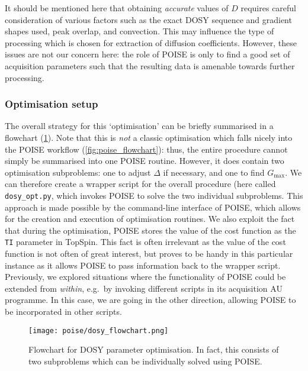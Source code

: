 It should be mentioned here that obtaining \textit{accurate} values of $D$ requires careful consideration of various factors such as the exact DOSY sequence and gradient shapes used\autocite{Sinnaeve2012CMR}, peak overlap\autocite{Antalek1996JACS,Windig1997CILS,Nilsson2006AC,Nilsson2008AC,Colbourne2011JACS}, and convection\autocite{Swan2015JMR,Barbosa2016RSCA}.
This may influence the type of processing which is chosen for extraction of diffusion coefficients.
However, these issues are not our concern here: the role of POISE is only to find a good set of acquisition parameters such that the resulting data is amenable towards further processing.


\subsubsection{Optimisation setup}

The overall strategy for this `optimisation' can be briefly summarised in a flowchart (\cref{fig:dosy_flowchart}).
Note that this is \textit{not} a classic optimisation which falls nicely into the POISE workflow (\cref{fig:poise_flowchart}): thus, the entire procedure cannot simply be summarised into one POISE routine.
However, it does contain two optimisation subproblems: one to adjust $\Delta$ if necessary, and one to find $G_\text{max}$.
We can therefore create a wrapper script for the overall procedure (here called \texttt{dosy\_opt.py}, which invokes POISE to solve the two individual subproblems.
This approach is made possible by the command-line interface of POISE, which allows for the creation and execution of optimisation routines.
We also exploit the fact that during the optimisation, POISE stores the value of the cost function as the \texttt{TI} parameter in TopSpin.
This fact is often irrelevant as the value of the cost function is not often of great interest, but proves to be handy in this particular instance as it allows POISE to pass information back to the wrapper script.
Previously, we explored situations where the functionality of POISE could be extended from \textit{within}, e.g.\ by invoking different scripts in its acquisition AU programme.
In this case, we are going in the other direction, allowing POISE to be incorporated in other scripts.

\begin{figure}[htb]
    \centering
    \texttt{[image: poise/dosy\_flowchart.png]}%
    \caption[Flowchart for DOSY parameter optimisation]{
        Flowchart for DOSY parameter optimisation. In fact, this consists of two subproblems which can be individually solved using POISE.
    }
    \label{fig:dosy_flowchart}
\end{figure}


